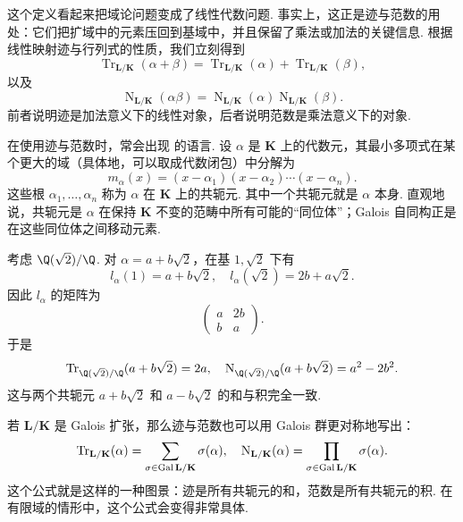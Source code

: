 这个定义看起来把域论问题变成了线性代数问题. 事实上，这正是迹与范数的用处：它们把扩域中的元素压回到基域中，并且保留了乘法或加法的关键信息. 根据线性映射迹与行列式的性质，我们立刻得到
\[
    \operatorname{Tr}_{\mathbf{L}/\mathbf{K}}(\alpha+\beta)
    =\operatorname{Tr}_{\mathbf{L}/\mathbf{K}}(\alpha)+\operatorname{Tr}_{\mathbf{L}/\mathbf{K}}(\beta),
\]
以及
\[
    \operatorname{N}_{\mathbf{L}/\mathbf{K}}(\alpha\beta)
    =\operatorname{N}_{\mathbf{L}/\mathbf{K}}(\alpha)\operatorname{N}_{\mathbf{L}/\mathbf{K}}(\beta).
\]
前者说明迹是加法意义下的线性对象，后者说明范数是乘法意义下的对象.

在使用迹与范数时，常会出现 的语言. 设 $\alpha$ 是 $\mathbf{K}$ 上的代数元，其最小多项式在某个更大的域（具体地，可以取成代数闭包）中分解为
\[
    m_\alpha(x)=(x-\alpha_1)(x-\alpha_2)\cdots(x-\alpha_n).
\]
这些根 $\alpha_1,\ldots,\alpha_n$ 称为 $\alpha$ 在 $\mathbf{K}$ 上的共轭元. 其中一个共轭元就是 $\alpha$ 本身. 直观地说，共轭元是 $\alpha$ 在保持 $\mathbf{K}$ 不变的范畴中所有可能的``同位体''；Galois 自同构正是在这些同位体之间移动元素.

\begin{example}{}{}
    考虑 $\Q(\sqrt{2})/\Q$. 对 $\alpha=a+b\sqrt{2}$，在基 $1,\sqrt{2}$ 下有
    \[
        l_\alpha(1)=a+b\sqrt{2},\quad
        l_\alpha(\sqrt{2})=2b+a\sqrt{2}.
    \]
    因此 $l_\alpha$ 的矩阵为
    \[
        \begin{pmatrix}
            a  & 2b \\
            b  & a
        \end{pmatrix}.
    \]
    于是
    \[
        \operatorname{Tr}_{\Q(\sqrt{2})/\Q}(a+b\sqrt{2})=2a,\quad
        \operatorname{N}_{\Q(\sqrt{2})/\Q}(a+b\sqrt{2})=a^2-2b^2.
    \]
    这与两个共轭元 $a+b\sqrt{2}$ 和 $a-b\sqrt{2}$ 的和与积完全一致.
\end{example}

若 $\mathbf{L}/\mathbf{K}$ 是 Galois 扩张，那么迹与范数也可以用 Galois 群更对称地写出：
\[
    \operatorname{Tr}_{\mathbf{L}/\mathbf{K}}(\alpha)
    =\sum_{\sigma\in\operatorname{Gal}\mathbf{L}/\mathbf{K}}\sigma(\alpha),\quad
    \operatorname{N}_{\mathbf{L}/\mathbf{K}}(\alpha)
    =\prod_{\sigma\in\operatorname{Gal}\mathbf{L}/\mathbf{K}}\sigma(\alpha).
\]
这个公式就是这样的一种图景：迹是所有共轭元的和，范数是所有共轭元的积. 在有限域的情形中，这个公式会变得非常具体.

